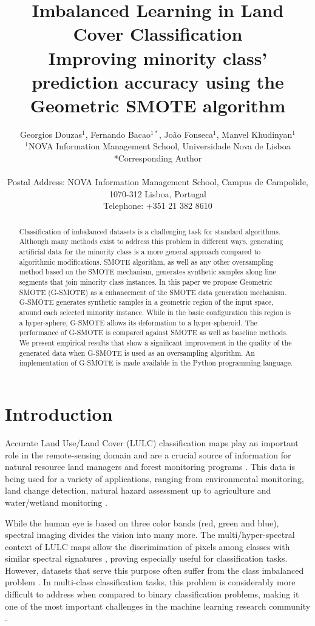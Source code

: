 \documentclass[parskip=full]{scrartcl}
\title{Imbalanced Learning in Land Cover Classification  \\ \LARGE{Improving minority class' prediction accuracy using the Geometric SMOTE algorithm}}
\author{
	Georgios Douzas\(^{1}\), Fernando Bacao\(^{1*}\), João Fonseca\(^{1}\), Manvel Khudinyan\(^{1}\)
	\\
	\small{\(^{1}\)NOVA Information Management School, Universidade Nova de Lisboa}
	\\
	\small{*Corresponding Author}
	\\
	\\
	\small{Postal Address: NOVA Information Management School, Campus de Campolide, 1070-312 Lisboa, Portugal}
	\\
	\small{Telephone: +351 21 382 8610}
}
\date{}
\begin{document}
\maketitle

\begin{abstract}
Classification of imbalanced datasets is a challenging task for standard
algorithms. Although many methods exist to address this problem in different
ways, generating artificial data for the minority class is a more general
approach compared to algorithmic modifications. SMOTE algorithm, as well as any
other oversampling method based on the SMOTE mechanism, generates synthetic
samples along line segments that join minority class instances. In this paper we
propose Geometric SMOTE (G-SMOTE) as a enhancement of the SMOTE data generation
mechanism. G-SMOTE generates synthetic samples in a geometric region of the
input space, around each selected minority instance. While in the basic
configuration this region is a hyper-sphere, G-SMOTE allows its deformation to a
hyper-spheroid. The performance of G-SMOTE is compared against SMOTE as well as
baseline methods. We present empirical results that show a significant
improvement in the quality of the generated data when G-SMOTE is used as an
oversampling algorithm. An implementation of G-SMOTE is made available in the
Python programming language.
\end{abstract}

\section{Introduction}

Accurate Land Use/Land Cover (LULC) classification maps play an important role
in the remote-sensing domain \cite{Cenggoro2018} and are a crucial source of
information for natural resource land managers and forest monitoring programs
\cite{Mellor2015}. This data is being used for a variety of applications,
ranging from environmental monitoring, land change detection, natural hazard
assessment up to agriculture and water/wetland monitoring \cite{Khatami2016}.

While the human eye is based on three color bands (red, green and blue),
spectral imaging divides the vision into many more. The multi/hyper-spectral
context of LULC maps allow the discrimination of pixels among classes with
similar spectral signatures \cite{Marconcini2009}, proving especially useful for
classification tasks. However, datasets that serve this purpose often suffer
from the class imbalanced problem \cite{Feng2019}. In multi-class classification
tasks, this problem is considerably more difficult to address when compared to
binary classification problems, making it one of the most important challenges
in the machine learning research community \cite{Garcia2018}.
\end{document}
